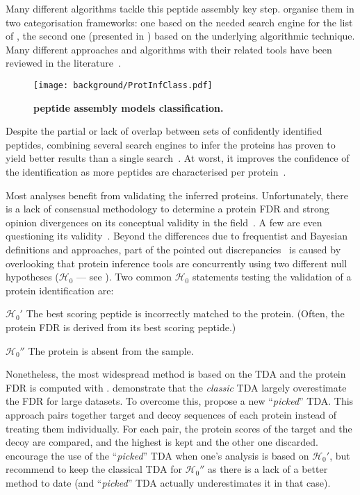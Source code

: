 Many different algorithms tackle this peptide assembly key step.
\citet{Huang2012-nr} organise them in two categorisation frameworks:
one based on the needed search engine for the list of \psms,
the second one (presented in )
based on the underlying algorithmic technique.
Many different approaches and algorithms with their related tools
have been reviewed in the literature~.

\begin{figure}[!htb]
    \texttt{[image: background/ProtInfClass.pdf]}\centering
    \caption[Peptide assembly models classification]{\label{fig:ProtInfClass}%
    \textbf{\citet{Huang2012-nr} peptide assembly models classification.}
    }
\end{figure}

Despite the partial or lack of overlap between
sets of confidently identified peptides,
combining several search engines to infer the proteins
has proven to yield better results than a single search~.
At worst, it improves the confidence of the identification
as more peptides are characterised per protein~.

Most analyses benefit from validating the inferred proteins.
Unfortunately,
there is a lack of consensual methodology
to determine a protein \gls{FDR}
and strong opinion divergences on its conceptual validity
in the field~.
A few are even questioning its validity~.
Beyond the differences due to frequentist and Bayesian definitions and approaches,
part of the pointed out discrepancies~ is caused by
overlooking that protein inference tools are concurrently using
two different null hypotheses ($\mathcal{H}_0$ --- see ).
Two common $\mathcal{H}_0$ statements testing
the validation of a protein identification are:
\begin{eqlist}
    \item[$\mathcal{H}_0'$] The best scoring peptide is incorrectly matched
        to the protein.
        (Often, the protein \gls{FDR} is derived from its best scoring peptide.)
    \item[$\mathcal{H}_0''$] The protein is absent from the sample.
\end{eqlist}

Nonetheless, the most widespread method is based on the \gls{TDA}
and the protein \gls{FDR} is computed with .
\citet{Savitski2015-fx} demonstrate that the \emph{classic} \gls{TDA}
largely overestimate the \gls{FDR} for large datasets.
To overcome this,
\citet{Savitski2015-fx} propose a new \enquote{\emph{picked}} \gls{TDA}.
This approach pairs together target and decoy sequences of each protein
instead of treating them individually.
For each pair, the protein scores of the target and the decoy are compared,
and the highest is kept and the other one discarded.
\citet{The2016-ua} encourage the use of the \enquote{\emph{picked}} \gls{TDA}
when one's analysis is based on $\mathcal{H}_0'$,
but recommend to keep the classical \gls{TDA} for $\mathcal{H}_0''$
as there is a lack of a better method to date
(and \enquote{\emph{picked}} \gls{TDA} actually underestimates it in that case).

